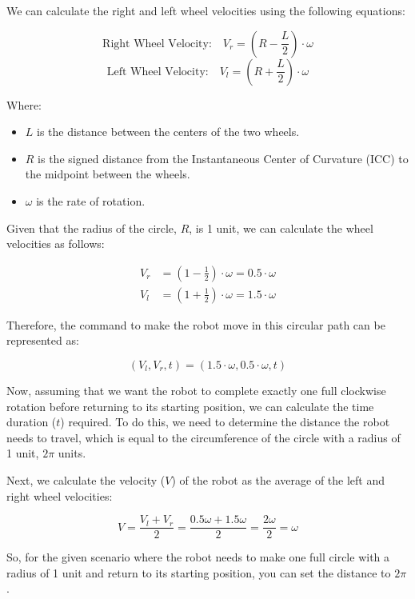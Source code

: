 \documentclass[answers]{exam}
\begin{document}
\begin{questions}
\begin{parts}
\begin{solution}
            We can calculate the right and left wheel velocities using the following
            equations:

            \[\text{Right Wheel Velocity:} \quad V_r = (R - \frac{L}{2}) \cdot \omega\]
            \[\text{Left Wheel Velocity:} \quad V_l = (R + \frac{L}{2}) \cdot \omega\]

            Where:
            \begin{itemize}
                \item \(L\) is the distance between the centers of the two wheels.
                \item \(R\) is the signed distance from the Instantaneous Center of Curvature (ICC) to the midpoint between the wheels.
                \item \(\omega\) is the rate of rotation.
            \end{itemize}

            Given that the radius of the circle, \(R\), is 1 unit, we can calculate the
            wheel velocities as follows:

            \begin{align*}
                V_r & = (1 - \frac{1}{2}) \cdot \omega = 0.5 \cdot \omega \\
                V_l & = (1 + \frac{1}{2}) \cdot \omega = 1.5 \cdot \omega
            \end{align*}

            Therefore, the command to make the robot move in this circular path can be
            represented as:

            \[(V_l, V_r, t) = (1.5\cdot\omega, 0.5\cdot\omega, t)\]

            Now, assuming that we want the robot to complete exactly one full clockwise
            rotation before returning to its starting position, we can calculate the time
            duration (\(t\)) required. To do this, we need to determine the distance the
            robot needs to travel, which is equal to the circumference of the circle with a
            radius of 1 unit, \(2\pi\) units.

            Next, we calculate the velocity (\(V\)) of the robot as the average of
            the left and right wheel velocities:

            \[V = \frac{V_l + V_r}{2} = \frac{0.5\omega + 1.5\omega}{2} = \frac{2\omega}{2} = \omega\]

            So, for the given scenario where the robot needs to make one full circle with a
            radius of 1 unit and return to its starting position, you can set the distance to
            \(2\pi\).


\end{solution}
\end{parts}
\end{questions}
\end{document}
